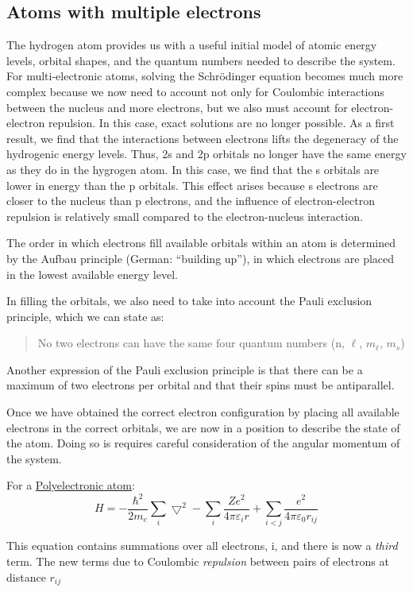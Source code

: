\documentclass[a4paper,titlepage]{article}
\begin{document}
\subsection{Atoms with multiple electrons}

The hydrogen atom provides us with a useful initial
model of atomic energy levels, orbital shapes, and the
quantum numbers needed to describe the system. For
multi-electronic atoms, solving the Schrödinger
equation becomes much more complex because we now
need to account not only for Coulombic interactions
between the nucleus and more electrons, but we also
must account for electron-electron repulsion. In this
case, exact solutions are no longer possible. As a first
result, we find that the interactions between electrons
lifts the degeneracy of the hydrogenic energy levels.
Thus, 2s and 2p orbitals no longer have the same
energy as they do in the hygrogen atom. In this case,
we find that the s orbitals are lower in energy than the p
orbitals. This effect arises because s electrons are closer to the nucleus than p electrons,
and the influence of electron-electron repulsion is relatively small compared to the
electron-nucleus interaction.

The order in which electrons fill available orbitals within
an atom is determined by the Aufbau principle (German:
“building up”), in which electrons are placed in the
lowest available energy level.

In filling the orbitals, we also need to take into account
the Pauli exclusion principle, which we can state as: \begin{quotation}
No two electrons can have the same four quantum
numbers (n, \(\ell\), \(m_\ell\), \(m_s\)) \end{quotation}
Another expression of the Pauli exclusion principle is
that there can be a maximum of two electrons per orbital
and that their spins must be antiparallel.

Once we have obtained the correct electron configuration by placing all available
electrons in the correct orbitals, we are now in a position to describe the state of the atom.
Doing so is requires careful consideration of the angular momentum of
the system.

\bigskip For a \underline{Polyelectronic atom}:\newline
\[ H=-\frac{\hbar^2}{2m_e}\sum_i\bigtriangledown^2 - \sum_i\frac{Ze^2}{4\pi\varepsilon_ir} + \sum_{i<j}\frac{e^2}{4\pi\varepsilon_0r_{ij}}\]

\medskip This equation contains summations over all electrons, i, and there is now a \textit{third} term. The new terms due to Coulombic \textit{repulsion} between pairs of electrons at distance \(r_{ij}\)
\end{document}
